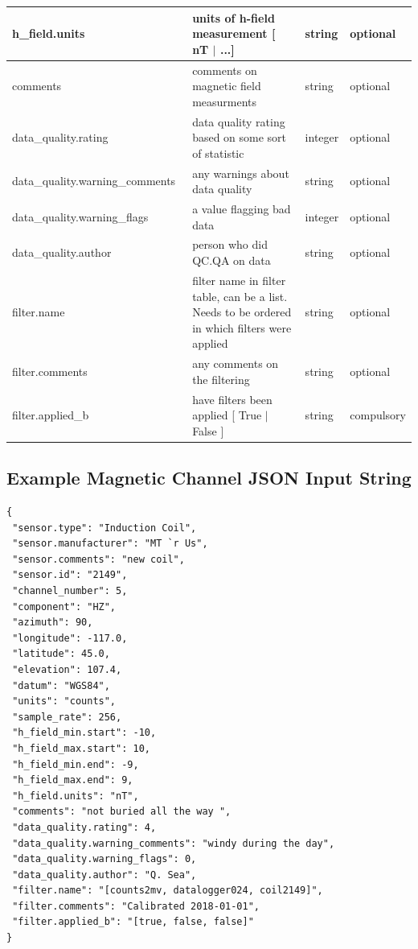 \documentclass{article}
\begin{document}
\begin{table}[htb!]
\begin{tabular}{|l|p{3in}|l|l|}
        h\_field.units\ & units of h-field measurement [ nT $|$ ...] & string &   optional \\ \hline
        comments\ & comments on magnetic field measurments & string &  optional \\ \hline
        data\_quality.rating\ & data quality rating based on some sort of statistic & integer &  optional \\ \hline
        data\_quality.warning\_comments\ & any warnings about data quality & string &   optional \\ \hline
        data\_quality.warning\_flags\ & a value flagging bad data  & integer &  optional \\ \hline
        data\_quality.author\ & person who did QC.QA on data & string &   optional \\ \hline
        filter.name\ & filter name in filter table, can be a list. Needs to be ordered in which filters were applied & string &  optional \\ \hline
        filter.comments\ & any comments on the filtering & string &  optional \\ \hline
        filter.applied\_b & have filters been applied [ True $|$ False ] & string & compulsory \\ \hline
        \end{tabular}
    \label{tab:magnetic}
\end{table}

\newpage
\subsection{Example Magnetic Channel JSON Input String}

\begin{verbatim}
{
 "sensor.type": "Induction Coil",
 "sensor.manufacturer": "MT `r Us",
 "sensor.comments": "new coil",
 "sensor.id": "2149",
 "channel_number": 5,
 "component": "HZ",
 "azimuth": 90,
 "longitude": -117.0,
 "latitude": 45.0,
 "elevation": 107.4,
 "datum": "WGS84",
 "units": "counts",
 "sample_rate": 256,
 "h_field_min.start": -10,
 "h_field_max.start": 10,
 "h_field_min.end": -9,
 "h_field_max.end": 9,
 "h_field.units": "nT",
 "comments": "not buried all the way ",
 "data_quality.rating": 4,
 "data_quality.warning_comments": "windy during the day",
 "data_quality.warning_flags": 0,
 "data_quality.author": "Q. Sea",
 "filter.name": "[counts2mv, datalogger024, coil2149]",
 "filter.comments": "Calibrated 2018-01-01",
 "filter.applied_b": "[true, false, false]"
}
\end{verbatim}
\end{document}
